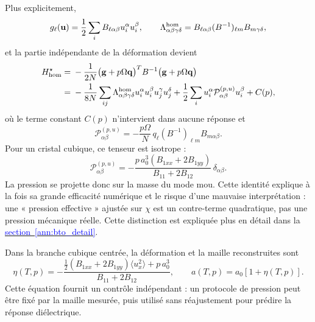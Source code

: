 Plus explicitement,
\begin{equation}
g_\ell(\mathbf u)=\frac12\sum_i
B_{\ell\alpha\beta}u_i^\alpha u_i^\beta,
\qquad
\Lambda^{\rm hom}_{\alpha\beta\gamma\delta}
=B_{\ell\alpha\beta}(B^{-1})_{\ell m}B_{m\gamma\delta},
\label{eq:core_g_lambda_hom}
\end{equation}
et la partie indépendante de la déformation devient
\begin{equation}
\begin{aligned}
H_{\rm hom}^{\star}
={}&-\frac{1}{2N}
\big(\mathbf g+p\Omega\mathbf q\big)^TB^{-1}
\big(\mathbf g+p\Omega\mathbf q\big)\\
={}&-\frac{1}{8N}\sum_{ij}
\Lambda^{\rm hom}_{\alpha\beta\gamma\delta}
u_i^\alpha u_i^\beta u_j^\gamma u_j^\delta
+\frac12\sum_i
u_i^\alpha\mathcal P_{\alpha\beta}^{(p,u)}u_i^\beta
+C(p),
\end{aligned}
\label{eq:core_homogeneous_eliminated}
\end{equation}
où le terme constant $C(p)$ n'intervient dans aucune réponse et
\begin{equation}
\mathcal P_{\alpha\beta}^{(p,u)}
=-\frac{p\Omega}{N}\,
q_\ell(B^{-1})_{\ell m}B_{m\alpha\beta}.
\label{eq:core_pressure_kernel_general}
\end{equation}
Pour un cristal cubique, ce tenseur est isotrope :
\begin{equation}
\boxed{
\mathcal P_{\alpha\beta}^{(p,u)}
=-\frac{p\,a_0^3(B_{1xx}+2B_{1yy})}{B_{11}+2B_{12}}\,
\delta_{\alpha\beta}.}
\label{eq:core_pressure_kernel_cubic}
\end{equation}
La pression se projette donc sur la masse du mode mou. Cette identité explique
à la fois sa grande efficacité numérique et le risque d'une mauvaise
interprétation : une « pression effective » ajustée sur $\chi$ est un
contre-terme quadratique, pas une pression mécanique réelle. Cette distinction
est expliquée plus en détail dans la
\hyperref[ann:bto_detail]{\textcolor{blue}{section~\ref*{ann:bto_detail}}}.

Dans la branche cubique centrée, la déformation et la maille reconstruites sont
\begin{equation}
\eta(T,p)=-
\frac{\tfrac12(B_{1xx}+2B_{1yy})\langle u_x^2\rangle+p\,a_0^3}
{B_{11}+2B_{12}},
\qquad
a(T,p)=a_0[1+\eta(T,p)].
\label{eq:core_lattice_reconstruction}
\end{equation}
Cette équation fournit un contrôle indépendant : un protocole de pression peut
être fixé par la maille mesurée, puis utilisé sans réajustement pour prédire la
réponse diélectrique.


